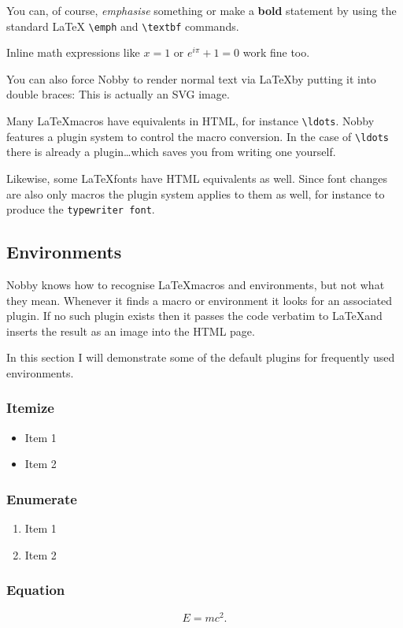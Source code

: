 \documentclass[10pt]{article}
\begin{document}
You can, of course, \emph{emphasise} something or make a
\textbf{bold} statement by using the standard \LaTeX
\texttt{\textbackslash{emph}} and \texttt{\textbackslash{textbf}} commands.

Inline math expressions like $x=1$ or $e^{i\pi} + 1 = 0$ work fine too.

You can also force Nobby to render normal text via \LaTeX by putting it into
double braces: {{This is actually an SVG image.}}

Many \LaTeX macros have equivalents in HTML, for instance
\texttt{\textbackslash{ldots}}. Nobby features a plugin system to
control the macro conversion. In the case of \texttt{\textbackslash{ldots}}
there is already a plugin\ldots which saves you from writing one yourself.

Likewise, some \LaTeX fonts have HTML equivalents as well. Since font changes
are also only macros the plugin system applies to them as well, for instance
to produce the \texttt{typewriter font}.

\subsection{Environments}
Nobby knows how to recognise \LaTeX macros and environments, but not what they
mean. Whenever it finds a macro or environment it looks for an associated
plugin. If no such plugin exists then it passes the code verbatim to \LaTeX and
inserts the result as an image into the HTML page.

In this section I will demonstrate some of the default plugins for frequently
used environments.

\subsubsection{Itemize}
\begin{itemize}
\item Item 1
\item Item 2
\end{itemize}

\subsubsection{Enumerate}
\begin{enumerate}
\item Item 1
\item Item 2
\end{enumerate}

\subsubsection{Equation}
\begin{equation}
  \label{eq:rel}
  E = mc^2.
\end{equation}
\end{document}
